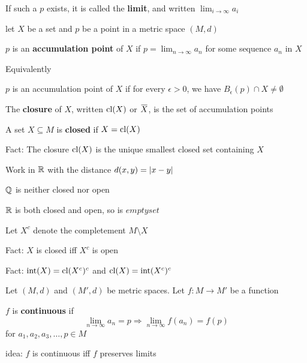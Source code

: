 \documentclass[11pt]{article}
\def \tint {\text{int}}
\begin{document}
If such a \(p\) exists, it is called the \textbf{limit}, and written \(\lim_{i\to\infty}a_i\)

let \(X\) be a set and \(p\) be a point in a metric space \((M,d)\)

\begin{definition}[]
\(p\) is an \textbf{accumulation point} of \(X\) if \(p=\lim_{n\to\infty}a_n\) for some sequence \(a_n\) in \(X\)
\end{definition}

Equivalently
\begin{definition}[]
\(p\) is an accumulation point of \(X\) if for every \(\epsilon>0\), we have \(B_\epsilon(p)\cap X\neq\emptyset\)
\end{definition}

\begin{definition}[]
The \textbf{closure} of \(X\), written \(\operatorname{\text{cl}}(X)\) or \(\barX\), is the set of accumulation points
\end{definition}

\begin{definition}[]
A set \(X\subseteq M\) is \textbf{closed} if \(X=\operatorname{\text{cl}}(X)\)
\end{definition}


Fact: The closure \(\operatorname{\text{cl}}(X)\) is the unique smallest closed set containing \(X\)

\begin{examplle}[]
Work in \(\mathbb{R}\) with the distance \(d(x,y)=\abs{x-y}\)

\(\mathbb{Q}\) is neither closed nor open

\(\mathbb{R}\) is both closed and open, so is \(emptyset\)
\end{examplle}

Let \(X^c\) denote the completement \(M\setminus X\)

Fact: \(X\) is closed iff \(X^c\) is open

Fact: \(\tint(X)=\cl(X^c)^c\) and \(\cl(X)=\tint(X^c)^c\)

Let \((M,d)\) and \((M',d)\) be metric spaces. Let \(f:M\to M'\) be a function
\begin{definition}[]
\(f\) is \textbf{continuous} if
\begin{equation*}
\lim_{n\to\infty}a_n=p\Rightarrow\lim_{n\to\infty}f(a_n)=f(p)
\end{equation*}
for \(a_1,a_2,a_3,\dots,p\in M\)
\end{definition}

idea: \(f\) is continuous iff \(f\) preserves limits
\end{document}
